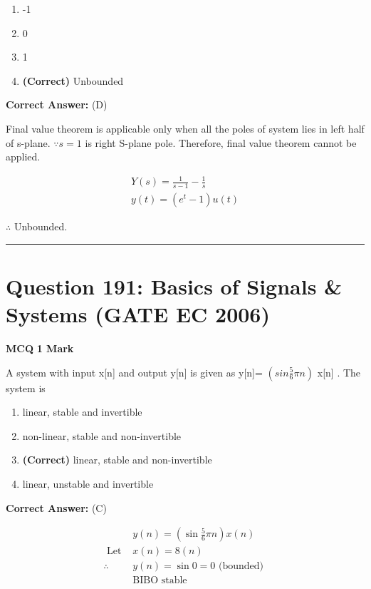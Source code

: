 \documentclass[11pt,a4paper]{article}
\begin{document}
\begin{enumerate}[label=(\Alph*)]
    \item -1
    \item 0
    \item 1
    \item \textbf{(Correct)} Unbounded
\end{enumerate}

\noindent \textbf{Correct Answer:} (D)

\begin{tcolorbox}[solbox, title=Detailed Solution -- Question 190]
Final value theorem is applicable only when all
the poles of system lies in left half of s-plane. 
$\because s=1$  is right S-plane pole. Therefore, final value
theorem cannot be applied.

\[
\begin{aligned}
Y(s)=\frac{1}{s-1}-\frac{1}{s} \\
y(t)=\left(e^{t}-1\right) u(t)
\end{aligned}
\]

$\therefore$  Unbounded.
\end{tcolorbox}

\vspace{1.5em}
\hrule
\vspace{1.5em}

\section*{Question 191: Basics of Signals \& Systems (GATE EC 2006)}
\noindent \textbf{\color{primary}MCQ} \hfill \textbf{\color{secondary}1 Mark}


\noindent A system with input x[n] and output y[n] is given as y[n]= $(sin\frac{5}{6}\pi n)$ x[n] . The system is


\begin{enumerate}[label=(\Alph*)]
    \item linear, stable and invertible
    \item non-linear, stable and non-invertible
    \item \textbf{(Correct)} linear, stable and non-invertible
    \item linear, unstable and invertible
\end{enumerate}

\noindent \textbf{Correct Answer:} (C)

\begin{tcolorbox}[solbox, title=Detailed Solution -- Question 191]
\[
\begin{aligned} & y(n)=\left(\sin \frac{5}{6} \pi n\right) x(n) \\ \text { Let } & x(n)=8(n) \\ \therefore & y(n)=\sin 0=0 \text { (bounded) } \\ &\text {BIBO stable } \end{aligned}
\]
\end{tcolorbox}
\end{document}

